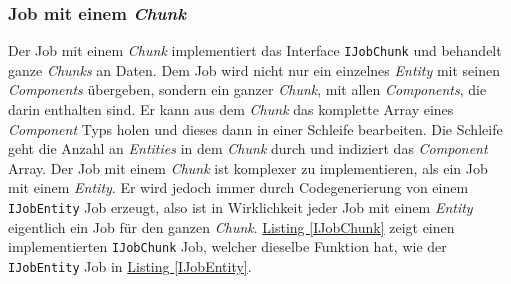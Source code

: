 \subsubsection{Job mit einem \textit{Chunk}}
Der Job mit einem \textit{Chunk} implementiert das Interface \texttt{IJobChunk} und behandelt ganze \textit{Chunks} an Daten. Dem Job wird nicht nur ein einzelnes \textit{Entity} mit seinen \textit{Components} übergeben, sondern ein ganzer \textit{Chunk}, mit allen \textit{Components}, die darin enthalten sind. Er kann aus dem \textit{Chunk} das komplette Array eines \textit{Component} Typs holen und dieses dann in einer Schleife bearbeiten. Die Schleife geht die Anzahl an \textit{Entities} in dem \textit{Chunk} durch und indiziert das \textit{Component} Array. Der Job mit einem \textit{Chunk} ist komplexer zu implementieren, als ein Job mit einem \textit{Entity}. Er wird jedoch immer durch Codegenerierung von einem \texttt{IJobEntity} Job erzeugt, also ist in Wirklichkeit jeder Job mit einem \textit{Entity} eigentlich ein Job für den ganzen \textit{Chunk}. \hyperref[IJobChunk]{Listing \ref*{IJobChunk}} zeigt einen implementierten \texttt{IJobChunk} Job, welcher dieselbe Funktion hat, wie der \texttt{IJobEntity} Job in \hyperref[IJobEntity]{Listing \ref*{IJobEntity}}.
